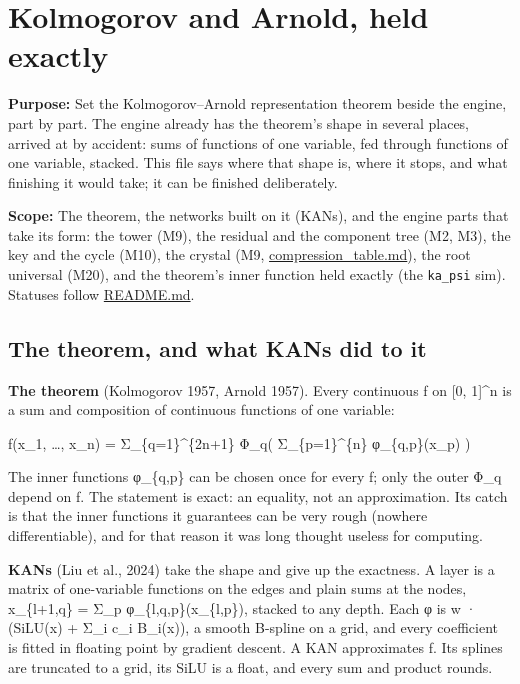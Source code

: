 \chapter{\texorpdfstring{Kolmogorov and Arnold, held exactly}{Kolmogorov and Arnold, held exactly}}
\label{chap:kolmogorov-arnold}

\textbf{Purpose:} Set the Kolmogorov–Arnold representation theorem beside the engine, part by part. The engine already has the theorem's shape in several places, arrived at by accident: sums of functions of one variable, fed through functions of one variable, stacked. This file says where that shape is, where it stops, and what finishing it would take; it can be finished deliberately.

\textbf{Scope:} The theorem, the networks built on it (KANs), and the engine parts that take its form: the tower (M9), the residual and the component tree (M2, M3), the key and the cycle (M10), the crystal (M9, \hyperref[chap:compression-table]{compression\_\allowbreak{}table.md}), the root universal (M20), and the theorem's inner function held exactly (the \texttt{ka\_\allowbreak{}psi} sim). Statuses follow \hyperref[chap:readme]{README.md}.

\section{\texorpdfstring{The theorem, and what KANs did to it}{The theorem, and what KANs did to it}}

\textbf{The theorem} (Kolmogorov 1957, Arnold 1957). Every continuous f on [0, 1]\textasciicircum{}n is a sum and composition of continuous functions of one variable:

f(x\_\allowbreak{}1, …, x\_\allowbreak{}n) = Σ\_\allowbreak{}\{q=1\}\textasciicircum{}\{2n+1\} Φ\_\allowbreak{}q( Σ\_\allowbreak{}\{p=1\}\textasciicircum{}\{n\} φ\_\allowbreak{}\{q,p\}(x\_\allowbreak{}p) )

The inner functions φ\_\allowbreak{}\{q,p\} can be chosen once for every f; only the outer Φ\_\allowbreak{}q depend on f. The statement is exact: an equality, not an approximation. Its catch is that the inner functions it guarantees can be very rough (nowhere differentiable), and for that reason it was long thought useless for computing.

\textbf{KANs} (Liu et al., 2024) take the shape and give up the exactness. A layer is a matrix of one-variable functions on the edges and plain sums at the nodes, x\_\allowbreak{}\{l+1,q\} = Σ\_\allowbreak{}p φ\_\allowbreak{}\{l,q,p\}(x\_\allowbreak{}\{l,p\}), stacked to any depth. Each φ is w · (SiLU(x) + Σ\_\allowbreak{}i c\_\allowbreak{}i B\_\allowbreak{}i(x)), a smooth B-spline on a grid, and every coefficient is fitted in floating point by gradient descent. A KAN approximates f. Its splines are truncated to a grid, its SiLU is a float, and every sum and product rounds.

